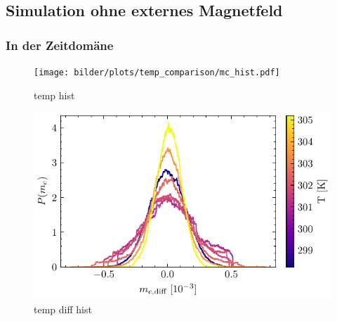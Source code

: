 \documentclass[main.tex]{subfiles}
\begin{document}
\subsection{Simulation ohne externes Magnetfeld}
\subsubsection{In der Zeitdomäne}

\begin{figure}[H]
    \centering
    \texttt{[image: bilder/plots/temp\_comparison/mc\_hist.pdf]}
    \caption{temp hist}\label{fig:temp-hist}    
\end{figure}

\begin{figure}[H]
    \centering
    \includegraphics{bilder/plots/temp_comparison_long/mc_diff_hist.pdf}
    \caption{temp diff hist}\label{fig:temp-diff-hist}    
\end{figure}
\end{document}
